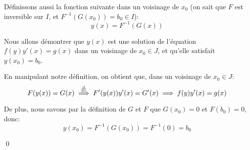 \documentclass[a4paper]{article}
\begin{document}
{{        Définissons aussi la fonction suivante dans un voisinage de $x_0$ (on sait que $F$ est inversible sur $I$, et $F^{-1}\left(G\left(x_0\right)\right) = b_0 \in I$): 
        \[y\left(x\right) = F^{-1}\left(G\left(x\right)\right)\]
        
        Nous allons démontrer que $y\left(x\right)$ est une solution de l'équation $f\left(y\right) y'\left(x\right) = g\left(x\right)$ dans un voisinage de $x_0 \in J$, et qu'elle satisfait $y\left(x_0\right) = b_0$.

        En manipulant notre définition, on obtient que, dans un voisinage de $x_0 \in J$: 
        \[F\left(y\left(x\right)\right) = G\left(x\right) \over{\implies}{$\frac{d}{dx}$}  F'\left(y\left(x\right)\right) y'\left(x\right) = G'\left(x\right) \implies f\left(y\right)y'\left(x\right) =  g\left(x\right)\]

        De plus, nous savons par la définition de $G$ et $F$ que $G\left(x_0\right) = 0$ et $F\left(b_0\right) = 0$, donc:
        \[y\left(x_0\right) = F^{-1}\left(G\left(x_0\right)\right) = F^{-1}\left(0\right) = b_0\]

        \qed
    }


}
\end{document}
